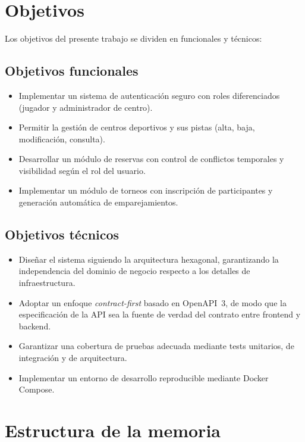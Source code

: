 \section{Objetivos}
\label{sec:objetivos}

Los objetivos del presente trabajo se dividen en funcionales y técnicos:

\subsection{Objetivos funcionales}

\begin{itemize}
  \item Implementar un sistema de autenticación seguro con roles diferenciados
        (jugador y administrador de centro).
  \item Permitir la gestión de centros deportivos y sus pistas (alta, baja,
        modificación, consulta).
  \item Desarrollar un módulo de reservas con control de conflictos temporales
        y visibilidad según el rol del usuario.
  \item Implementar un módulo de torneos con inscripción de participantes y
        generación automática de emparejamientos.
\end{itemize}

\subsection{Objetivos técnicos}

\begin{itemize}
  \item Diseñar el sistema siguiendo la arquitectura hexagonal, garantizando
        la independencia del dominio de negocio respecto a los detalles de
        infraestructura.
  \item Adoptar un enfoque \textit{contract-first} basado en OpenAPI~3, de modo
        que la especificación de la API sea la fuente de verdad del contrato
        entre frontend y backend.
  \item Garantizar una cobertura de pruebas adecuada mediante tests unitarios,
        de integración y de arquitectura.
  \item Implementar un entorno de desarrollo reproducible mediante Docker Compose.
\end{itemize}

\section{Estructura de la memoria}
\label{sec:estructura}

